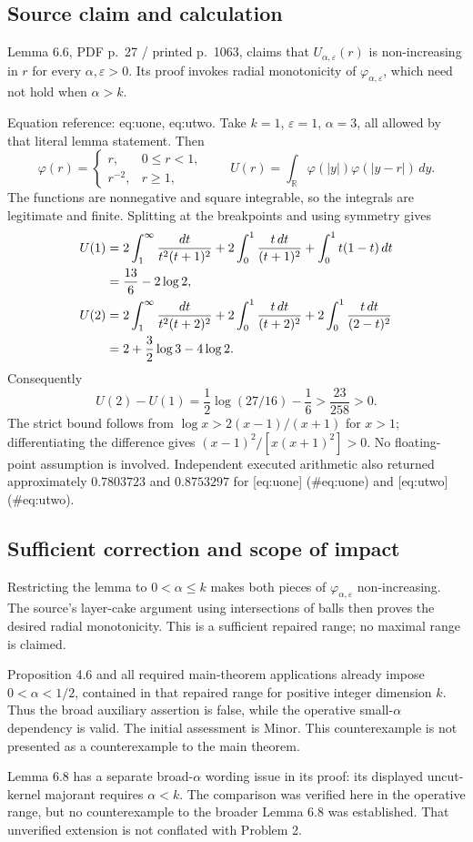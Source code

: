 \documentclass[10pt]{article}
\begin{document}
\subsection*{Source claim and calculation}
Lemma 6.6, PDF p. 27 / printed p. 1063, claims that \(U_{\alpha,\varepsilon}(r)\) is non-increasing in \(r\) for every \(\alpha,\varepsilon>0\). Its proof invokes radial monotonicity of \(\varphi_{\alpha,\varepsilon}\), which need not hold when \(\alpha>k\).\par
Equation reference: eq:uone, eq:utwo. Take \(k=1\), \(\varepsilon=1\), \(\alpha=3\), all allowed by that literal lemma statement. Then \[\varphi(r)=
 \begin{cases}r,&0\le r<1,\\r^{-2},&r\ge1,\end{cases}
 \qquad
 U(r)=\int_{\mathbb R}\varphi(|y|)\varphi(|y-r|)\,dy.\] The functions are nonnegative and square integrable, so the integrals are legitimate and finite. Splitting at the breakpoints and using symmetry gives \[\begin{aligned}
 U(1)
 &=2\int_1^\infty\frac{dt}{t^2(t+1)^2}
   +2\int_0^1\frac{t\,dt}{(t+1)^2}
   +\int_0^1t(1-t)\,dt\notag\\
 &=\frac{13}{6}-2\log2,\\
 U(2)
 &=2\int_1^\infty\frac{dt}{t^2(t+2)^2}
   +2\int_0^1\frac{t\,dt}{(t+2)^2}
   +2\int_0^1\frac{t\,dt}{(2-t)^2}\notag\\
 &=2+\frac32\log3-4\log2.\end{aligned}\] Consequently \[U(2)-U(1)=\frac12\log(27/16)-\frac16
 >\frac{23}{258}>0.\] The strict bound follows from \(\log x>2(x-1)/(x+1)\) for \(x>1\); differentiating the difference gives \((x-1)^2/[x(x+1)^2]>0\). No floating-point assumption is involved. Independent executed arithmetic also returned approximately \(0.7803723\) and \(0.8753297\) for [eq:uone] (\#eq:uone) and [eq:utwo] (\#eq:utwo).\par
\subsection*{Sufficient correction and scope of impact}
Restricting the lemma to \(0<\alpha\le k\) makes both pieces of \(\varphi_{\alpha,\varepsilon}\) non-increasing. The source’s layer-cake argument using intersections of balls then proves the desired radial monotonicity. This is a sufficient repaired range; no maximal range is claimed.\par
Proposition 4.6 and all required main-theorem applications already impose \(0<\alpha<1/2\), contained in that repaired range for positive integer dimension \(k\). Thus the broad auxiliary assertion is false, while the operative small-\(\alpha\) dependency is valid. The initial assessment is Minor. This counterexample is not presented as a counterexample to the main theorem.\par
Lemma 6.8 has a separate broad-\(\alpha\) wording issue in its proof: its displayed uncut-kernel majorant requires \(\alpha<k\). The comparison was verified here in the operative range, but no counterexample to the broader Lemma 6.8 was established. That unverified extension is not conflated with Problem 2.\par
\end{document}
